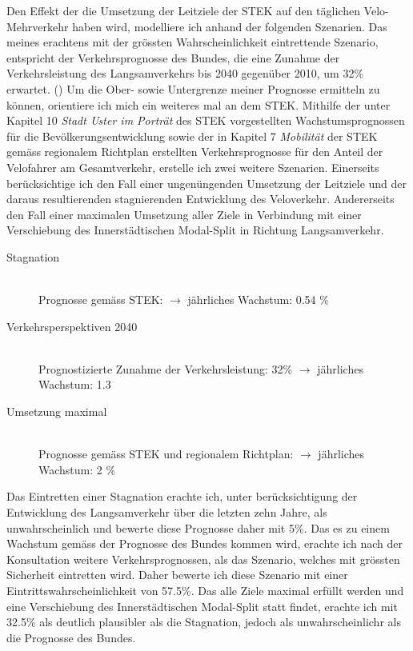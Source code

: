 Den Effekt der die Umsetzung der Leitziele der STEK auf den täglichen Velo-Mehrverkehr haben wird, modelliere ich anhand der folgenden Szenarien. Das meines erachtens mit der grössten Wahrscheinlichkeit eintrettende Szenario, entspricht der Verkehrsprognosse des Bundes, die eine Zunahme der Verkehrsleistung des Langsamverkehrs bis 2040 gegenüber 2010, um 32\% erwartet. (\cite{Perspektive2040}) 
Um die Ober- sowie Untergrenze meiner Prognosse ermitteln zu können, orientiere ich mich ein weiteres mal an dem STEK. Mithilfe der unter Kapitel 10 \textit{Stadt Uster im Porträt} des STEK vorgestellten Wachstumsprognossen für die Bevölkerungsentwicklung sowie der in Kapitel 7 \textit{Mobilität} der STEK gemäss regionalem Richtplan erstellten Verkehrsprognosse für den Anteil der Velofahrer am Gesamtverkehr, erstelle ich zwei weitere Szenarien. 
Einerseits berücksichtige ich den Fall einer ungenüngenden Umsetzung der Leitziele und der daraus resultierenden stagnierenden Entwicklung des Veloverkehr. Andererseits den Fall einer maximalen Umsetzung aller Ziele in Verbindung mit einer Verschiebung des Innerstädtischen Modal-Split in Richtung Langsamverkehr.

\begin{description}
\item[Stagnation] \hfill \\
Prognosse gemäss STEK: $\rightarrow$ jährliches Wachstum: 0.54 \% 
\item[Verkehrsperspektiven 2040] \hfill \\
Prognostizierte Zunahme der Verkehrsleistung: 32\% $\rightarrow$ jährliches Wachstum: 1.3 
\item[Umsetzung maximal] \hfill \\
Prognosse gemäss STEK und regionalem Richtplan: $\rightarrow$ jährliches Wachstum: 2 \% 
\end{description}

Das Eintretten einer Stagnation erachte ich, unter berücksichtigung der Entwicklung des Langsamverkehr über die letzten zehn Jahre, als unwahrscheinlich und bewerte diese Prognosse daher mit 5\%.
Das es zu einem Wachstum gemäss der Prognosse des Bundes kommen wird, erachte ich nach der Konsultation weitere Verkehrsprognossen, als das Szenario, welches mit grössten Sicherheit eintretten wird. Daher bewerte ich diese Szenario mit einer Eintrittswahrscheinlichkeit von 57.5\%. 
Das alle Ziele maximal erfüllt werden und eine Verschiebung des Innerstädtischen Modal-Split statt findet, erachte ich mit 32.5\% als deutlich plausibler als die Stagnation, jedoch als unwahrscheinlichr als die Prognosse des Bundes. 

